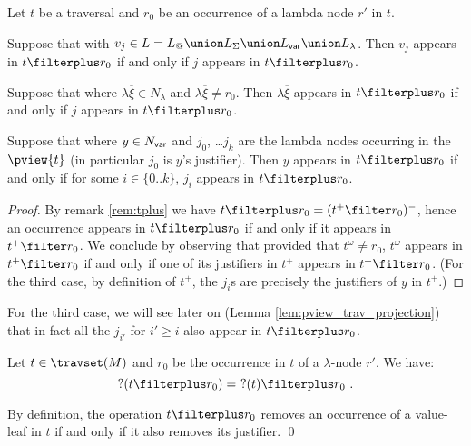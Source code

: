 \begin{lemma}
\label{lem:ifin_projplus_so_does_justifier} Let $t$ be a traversal
and  $r_0$ be an occurrence of a lambda node $r'$ in $t$.
\begin{compactitem}
  \item Suppose that  with $v_j \in L = L_@ \union L_\Sigma \union L_{\sf var} \union L_\lambda$.
      Then $v_j$ appears in $t\filterplus r_0$ if and only if
      $j$ appears in $t\filterplus r_0$.
  \item Suppose that  where $\lambda \overline{\xi} \in N_\lambda$
          and $\lambda \overline{\xi} \neq r_0$.
          Then $\lambda \overline{\xi}$ appears in $t\filterplus r_0$ if and only if $j$ appears in $t\filterplus r_0$.

  \item Suppose that  where $y\in N_{\sf var}$ and $j_0$, \ldots $j_k$ are the lambda nodes occurring in the $\pview{t}$ (in particular $j_0$ is $y$'s justifier). Then $y$ appears in $t\filterplus r_0$ if and only if for some $i \in \{0..k\}$, $j_i$ appears in $t\filterplus r_0$.
\end{compactitem}
\end{lemma}
\begin{proof}
By remark \ref{rem:tplus} we have $t\filterplus r_0 = (t^+ \filter
r_0)^-$, hence an occurrence appears in $t\filterplus r_0$ if and
only if it appears in $t^+ \filter r_0$. We conclude by observing
that provided that $t^\omega \neq r_0$, $t^\omega$ appears in $t^+
\filter r_0$ if and only if one of its justifiers in $t^+$ appears
in $t^+ \filter r_0$. (For the third case, by definition of $t^+$,
the $j_i$s are precisely the justifiers of $y$ in $t^+$.)
\end{proof}
For the third case, we will see later on (Lemma
\ref{lem:pview_trav_projection}) that in fact all the $j_{i'}$ for
$i' \geq i$ also appear in $t\filterplus r_0$.
\bigskip

\begin{lemma}
\label{lem:projplus_pendingnode}
 Let $t \in \travset(M)$ and $r_0$ be the occurrence in $t$ of a $\lambda$-node $r'$.
 We have:
  $$?(t\filterplus r_0) =\ ?(t) \filterplus r_0 \ .$$
\end{lemma}
\proof
 By definition, the operation $t \filterplus r_0$ removes an occurrence of a value-leaf in $t$
if and only if it also removes its justifier. \qed



